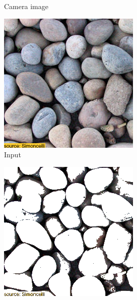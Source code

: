 \begin{figure}[]
\begin{subfigure}{\textwidth}
\begin{subfigure}{0.24\textwidth}
            \caption{Camera image}
            \label{fig:ex01-pebbles-5steps-some_proj}
        \end{subfigure}
        
        \begin{subfigure}{0.24\textwidth}
            \centering
            \includegraphics[width=\textwidth]{images/04-experiment01/pebbles/target.jpg}
            \caption{Input}
            \label{fig:ex01-pebbles-5steps-threshold_target}
        \end{subfigure}
        \hfill
        \begin{subfigure}{0.24\textwidth}
            \centering
            \includegraphics[width=\textwidth]{images/04-experiment01/pebbles/threshold_bg.jpg}

\end{subfigure}
\end{subfigure}
\end{figure}
